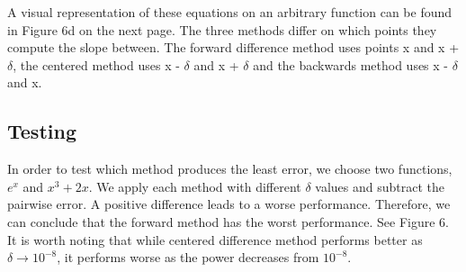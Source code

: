 \documentclass{article}
\begin{document}
\noindent A visual representation of these equations on an arbitrary function can be found in Figure 6d on the next page. The three methods differ on which points they compute the slope between. The forward difference method uses points x and x + $\delta$, the centered method uses x - $\delta$ and x + $\delta$ and the backwards method uses x - $\delta$ and x.

\subsection{Testing}

In order to test which method produces the least error, we choose two functions, $e^{x}$ and $x^3 + 2x$. We apply each method with different $\delta$ values and subtract the pairwise error. A positive difference leads to a worse performance. Therefore, we can conclude that the forward method has the worst performance. See Figure 6. \\

\noindent It is worth noting that while centered difference method performs better as $\delta \rightarrow 10^{-8}$, it performs worse as the power decreases from $10^{-8}$.
\end{document}
